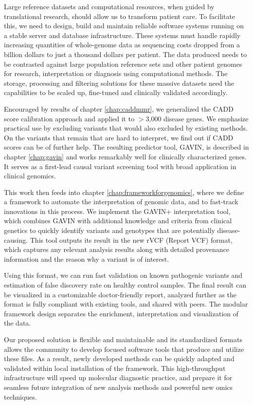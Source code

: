 Large reference datasets and computational resources, when guided by translational research, should allow us to transform patient care.
To facilitate this, we need to design, build and maintain reliable software systems\cite{Prins_2015} running on a stable server and database infrastructure\cite{Swertz_2007}.
These systems must handle rapidly increasing quantities of whole-ge\-no\-me data as sequencing costs dropped from a billion dollars to just a thousand dollars per patient.
The data produced needs to be contrasted against large population reference sets and other patient genomes for research, interpretation or diagnosis using computational methods.
The storage, processing and filtering solutions for these massive datasets need the capabilities to be scaled up, fine-tuned and clinically validated accordingly.

Encouraged by results of chapter \ref{chap:caddmmr}, we generalized the CADD score calibration approach and applied it to $>$3,000 disease genes.
We emphasize practical use by excluding variants that would also excluded by existing methods.
On the variants that remain that are hard to interpret, we find out if CADD scores can be of further help.
The resulting predictor tool, GAVIN, is described in chapter \ref{chap:gavin} and works remarkably well for clinically characterized genes.
It serves as a first-lead causal variant screening tool with broad application in clinical genomics.

This work then feeds into chapter \ref{chap:frameworkforgenomics}, where we define a framework to automate the interpretation of genomic data, and to fast-track innovations in this process. 
We implement the GAVIN+ interpretation tool, which combines GAVIN with additional knowledge and criteria from clinical genetics to quickly identify variants and genotypes that are potentially disease-causing.
This tool outputs its result in the new rVCF (Report VCF) format, which captures any relevant analysis results along with detailed provenance information and the reason why a variant is of interest.

Using this format, we can run fast validation on known pathogenic variants and estimation of false discovery rate on healthy control samples.
The final result can be visualized in a customizable doctor-friendly report, analyzed further as the format is fully compliant with existing tools, and shared with peers.
The modular framework design separates the enrichment, interpretation and visualization of the data.

Our proposed solution is flexible and maintainable and its standardized formats allows the community to develop focused software tools that produce and utilize these files.
As a result, newly developed methods can be quickly adapted and validated within local installation of the framework.
This high-throughput infrastructure will speed up molecular diagnostic practice, and prepare it for seamless future integration of new analysis methods and powerful new omics techniques.

